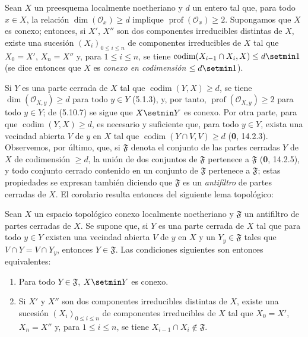 \begin{corollary}[5.10.8]
\label{IV.2.s5.10.8-fr}
Sean $X$ un preesquema localmente noetheriano y $d$ un entero tal que, para
todo $x\in X$, la relación $\dim(\mathcal O_x)\geq d$ implique
$\operatorname{prof}(\mathcal O_x)\geq2$. Supongamos que $X$ es conexo;
entonces, si $X'$, $X''$ son dos componentes irreducibles distintas de $X$,
existe una sucesión $(X_i)_{0\leq i\leq n}$ de componentes irreducibles de
$X$ tal que $X_0=X'$, $X_n=X''$ y, para $1\leq i\leq n$, se tiene
$\operatorname{codim}(X_{i-1}\cap X_i,X)\leq d\setmin 1$
\textup{(se dice entonces que $X$ es \emph{conexo en codimensión} $\leq d\setmin 1$)}.
\end{corollary}

Si $Y$ es una parte cerrada de $X$ tal que
$\operatorname{codim}(Y,X)\geq d$, se tiene $\dim(\mathcal O_{X,y})\geq d$
para todo $y\in Y$ (5.1.3), y, por tanto,
$\operatorname{prof}(\mathcal O_{X,y})\geq2$ para todo $y\in Y$; de (5.10.7)
se sigue que $X\setmin Y$ es conexo. Por otra parte, para que
$\operatorname{codim}(Y,X)\geq d$, es necesario y suficiente que, para todo
$y\in Y$, exista una vecindad abierta $V$ de $y$ en $X$ tal que
$\operatorname{codim}(Y\cap V,V)\geq d$ (\textbf 0, 14.2.3). Observemos, por último,
que, si $\mathfrak F$ denota el conjunto de las partes cerradas $Y$ de $X$ de
codimensión $\geq d$, la unión de dos conjuntos de $\mathfrak F$ pertenece a
$\mathfrak F$ (\textbf 0, 14.2.5), y todo conjunto cerrado contenido en un conjunto de
$\mathfrak F$ pertenece a $\mathfrak F$; estas propiedades se expresan también
diciendo que $\mathfrak F$ es un \emph{antifiltro} de partes cerradas de $X$.
El corolario resulta entonces del siguiente lema topológico:

\begin{lemma}[5.10.8.1]
\label{IV.2.s5.10.8.1-fr}
Sean $X$ un espacio topológico conexo localmente noetheriano y $\mathfrak F$
un antifiltro de partes cerradas de $X$. Se supone que, si $Y$ es una parte
cerrada de $X$ tal que para todo $y\in Y$ existen una vecindad abierta $V$ de
$y$ en $X$ y un $Y_y\in\mathfrak F$ tales que $V\cap Y=V\cap Y_y$, entonces
$Y\in\mathfrak F$. Las condiciones siguientes son entonces equivalentes:
\begin{enumerate}
\item[\textup{a)}] Para todo $Y\in\mathfrak F$, $X\setmin Y$ es conexo.
\item[\textup{b)}] Si $X'$ y $X''$ son dos componentes irreducibles distintas de $X$,
existe una sucesión $(X_i)_{0\leq i\leq n}$ de componentes irreducibles de
$X$ tal que $X_0=X'$, $X_n=X''$ y, para $1\leq i\leq n$, se tiene
$X_{i-1}\cap X_i\notin\mathfrak F$.
\end{enumerate}
\end{lemma}

